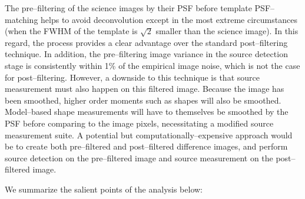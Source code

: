 \documentclass[iop]{emulateapj}
\begin{document}
The pre--filtering of the science images by their PSF before template PSF--matching helps to avoid deconvolution except in the most extreme circumstances (when the FWHM of the template is $\sqrt{2}$ smaller than the science image).
In this regard, the process provides a clear advantage over the standard post--filtering technique.
In addition, the pre--filtering image variance in the source detection stage is consistently within 1\% of the empirical image noise, which is not the case for post--filtering.
However, a downside to this technique is that source measurement must also happen on this filtered image.
Because the image has been smoothed, higher order moments such as shapes will also be smoothed.
Model--based shape measurements will have to themselves be smoothed by the PSF before comparing to the image pixels, necessitating a modified source measurement suite.
A potential but computationally--expensive approach would be to create both pre--filtered and post--filtered difference images, and perform source detection on the pre--filtered image and source measurement on the post--filtered image.

We summarize the salient points of the analysis below:
\end{document}
